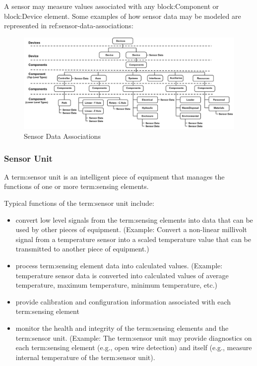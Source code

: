 A sensor may measure values associated with any {block:Component} or {block:Device} element.   Some examples of how sensor data may be modeled are represented in {ref:sensor-data-associations}:

\begin{figure}[ht]
  \centering
  \includegraphics[width=.75\textwidth]{figures/sensor-data-associations.png}
  \caption{Sensor Data Associations}
  \label{fig:sensor-data-associations}
\end{figure}

\subsubsection{Sensor Unit}
\label{sec:Sensor Unit}

A {term:sensor unit} is an intelligent piece of equipment that manages the functions of one or more {term:sensing elements}.

Typical functions of the {term:sensor unit} include:

\begin{itemize}
\item convert low level signals from the {term:sensing elements} into data that can be used by other pieces of equipment.  (Example:  Convert a non-linear millivolt signal from a temperature sensor into a scaled temperature value that can be transmitted to another piece of equipment.)

\item process {term:sensing element} data into calculated values.  (Example:  temperature sensor data is converted into calculated values of average temperature, maximum temperature, minimum temperature, etc.)

\item provide calibration and configuration information associated with each {term:sensing element}

\item monitor the health and integrity of the {term:sensing elements} and the {term:sensor unit}.  (Example:  The {term:sensor unit} may provide diagnostics on each {term:sensing element} (e.g., open wire detection) and itself (e.g., measure internal temperature of the {term:sensor unit}).
\end{itemize}


